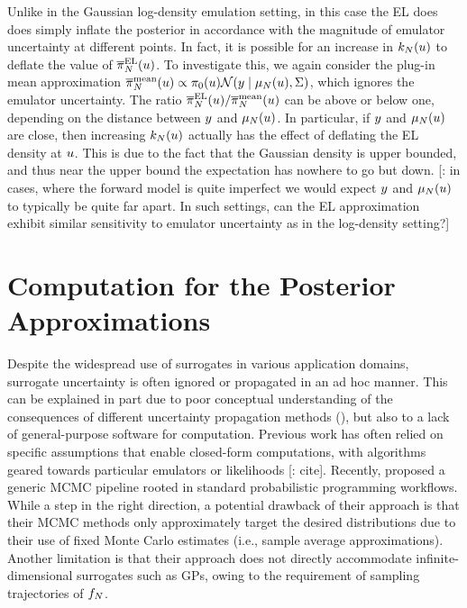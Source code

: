 \documentclass[12pt]{article}
\begin{document}
Unlike in the Gaussian log-density emulation setting, in this case the EL does does simply 
inflate the posterior in accordance with the magnitude of emulator uncertainty at different points.
In fact, it is possible for an increase in $k_{N}(u)$ to deflate the value of $\overline{\pi}_{N}^{\mathrm{EL}}(u)$.
To investigate this, we again consider the plug-in mean approximation
$\overline{\pi}_{N}^{\mathrm{mean}}(u) \propto \pi_0(u) \mathcal{N}(y \mid \mu_{N}(u), \Sigma)$,
which ignores the emulator uncertainty. The ratio 
$\overline{\pi}_{N}^{\mathrm{EL}}(u)/\overline{\pi}_{N}^{\mathrm{mean}}(u)$ can be above 
or below one, depending on the distance between $y$ and $\mu_{N}(u)$. In particular,
if $y$ and $\mu_{N}(u)$ are close, then increasing $k_{N}(u)$ actually has the effect
of deflating the EL density at $u$. This is due to the fact that the Gaussian density is 
upper bounded, and thus near the upper bound the expectation has nowhere to go but down.
[\todo: in cases, where the forward model is quite imperfect we would expect $y$ and $\mu_{N}(u)$
to typically be quite far apart. In such settings, can the EL approximation exhibit similar sensitivity to 
emulator uncertainty as in the log-density setting?]
 
\section{Computation for the Posterior Approximations} \label{sec:computation}
Despite the widespread use of surrogates in various application domains, 
surrogate uncertainty is often ignored or propagated in an ad hoc manner.
This can be explained in part due to poor conceptual understanding 
of the consequences of different uncertainty propagation methods
(), but also to a lack of general-purpose software
for computation. Previous work has often relied on specific assumptions that
enable closed-form computations, with algorithms geared towards
particular emulators or likelihoods [\todo: cite]. Recently, \citep{BurknerSurrogate}
proposed a generic MCMC pipeline rooted in standard probabilistic programming
workflows. While a step in the right direction, a potential drawback of their approach
is that their MCMC methods only approximately target the desired distributions 
due to their use of fixed Monte Carlo estimates (i.e., sample average approximations).
Another limitation is that their approach does not directly accommodate 
infinite-dimensional surrogates such as GPs, owing to the requirement of 
sampling trajectories of $f_{N}$.
\end{document}
